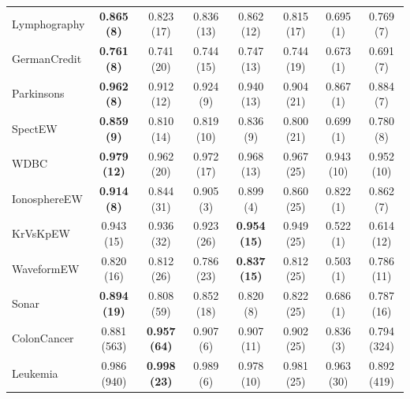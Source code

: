\documentclass[preprint,3p,times]{elsarticle}
\begin{document}
\begin{table}[!tbp]
\begin{tabular}{lccccccc}
Lymphography & \textbf{0.865 (8)} & 0.823 (17) & 0.836 (13) & 0.862 (12) & 0.815 (17) & 0.695 (1) & 0.769 (7) \\
GermanCredit & \textbf{0.761 (8)} & 0.741 (20) & 0.744 (15) & 0.747 (13) & 0.744 (19) & 0.673 (1) & 0.691 (7) \\
Parkinsons & \textbf{0.962 (8)} & 0.912 (12) & 0.924 (9) & 0.940 (13) & 0.904 (21) & 0.867 (1) & 0.884 (7) \\
SpectEW & \textbf{0.859 (9)} & 0.810 (14) & 0.819 (10) & 0.836 (9) & 0.800 (21) & 0.699 (1) & 0.780 (8) \\
WDBC & \textbf{0.979 (12)} & 0.962 (20) & 0.972 (17) & 0.968 (13) & 0.967 (25) & 0.943 (10) & 0.952 (10) \\
IonosphereEW & \textbf{0.914 (8)} & 0.844 (31) & 0.905 (3) & 0.899 (4) & 0.860 (25) & 0.822 (1) & 0.862 (7) \\
KrVsKpEW & 0.943 (15) & 0.936 (32) & 0.923 (26) & \textbf{0.954 (15)} & 0.949 (25) & 0.522 (1) & 0.614 (12) \\
WaveformEW & 0.820 (16) & 0.812 (26) & 0.786 (23) & \textbf{0.837 (15)} & 0.812 (25) & 0.503 (1) & 0.786 (11) \\
Sonar & \textbf{0.894 (19)} & 0.808 (59) & 0.852 (18) & 0.820 (8) & 0.822 (25) & 0.686 (1) & 0.787 (16) \\
ColonCancer & 0.881 (563) & \textbf{0.957 (64)} & 0.907 (6) & 0.907 (11) & 0.902 (25) & 0.836 (3) & 0.794 (324) \\
Leukemia & 0.986 (940) & \textbf{0.998 (23)} & 0.989 (6) & 0.978 (10) & 0.981 (25) & 0.963 (30) & 0.892 (419) \\
\bottomrule
\end{tabular}
\end{table}
\end{document}
